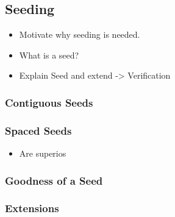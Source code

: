\documentclass[12pt]{article}
\begin{document}
\subsection{Seeding}
\label{subsec:seeding}



\begin{itemize}
    \item Motivate why seeding is needed.
    \item What is a seed?
    \item Explain Seed and extend -> Verification
\end{itemize}

\subsubsection{Contiguous Seeds}
\label{subsubsec:cont-seeds}

\subsubsection{Spaced Seeds}
\label{subsubsec:spaced-seeds}

\begin{itemize}
    \item Are superios \cite{Zhang2007}
\end{itemize}

\subsubsection{Goodness of a Seed}
\label{subsubsec:goodness-seed}

\subsubsection{Extensions}
\label{subsubsec:seeds-extensions}
\end{document}
